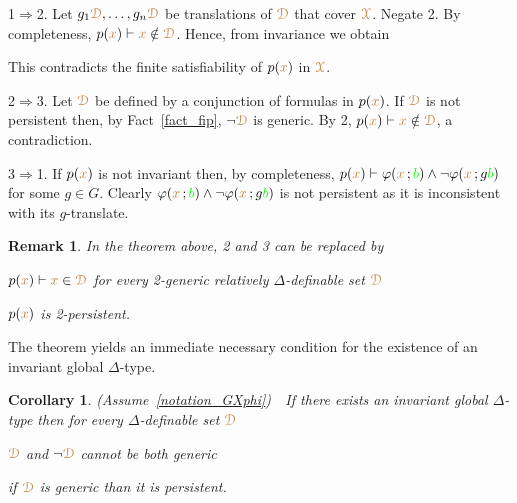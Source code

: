 \documentclass[10pt,openany]{amsproc}
\makeatletter
\newcommand{\mylabel}[1]{{\ssf{#1}}\hfill}
\renewenvironment{itemize}
  {\begin{list}{}{%
   \setlength{\parskip}{0mm}
   \setlength{\topsep}{.2\baselineskip}
   \setlength{\rightmargin}{0mm}
   \setlength{\listparindent}{0mm}
   \setlength{\itemindent}{0mm}
   \setlength{\labelwidth}{2ex}
   \setlength{\itemsep}{.1\baselineskip}
   \setlength{\parsep}{0mm}
   \setlength{\partopsep}{0mm}
   \setlength{\labelsep}{1ex}
   \setlength{\leftmargin}{\labelwidth+\labelsep}
   \let\makelabel\mylabel
   }}
   {\vspace*{-.3\baselineskip}\end{list}}
\def\proves{\vdash}
\def\IMP{\Rightarrow}
\def\D{\EuScript D}
\def\X{\EuScript X}
\def\theta{\vartheta}
\def\phi{\varphi}
\def\ssf#1{\textsf{\small #1}}
\newcounter{thm}
\theoremstyle{mio}
\newtheorem{corollary}[thm]{Corollary}\tcolorboxenvironment{corollary}{mythm}
\newtheorem{remark}[thm]{Remark}\tcolorboxenvironment{remark}{mythm}
\providecommand{\proofNameStyle}{\bfseries}
\renewenvironment{proof}[1][\proofname]{\par
  \pushQED{\qed}%
  \normalfont%
  \trivlist
  \item[\hskip\labelsep
        \proofNameStyle
    #1\@addpunct{.}]\ignorespaces
}{%
  \popQED\endtrivlist\@endpefalse
}
\def\mr{\color{brown}}
\def\gr{\color{green}}
\def\mrD{{\mr\D}}
\def\mrX{{\mr\X}}
\makeatother
\begin{document}
\begin{proof}
  \ssf1$\IMP$\ssf2.
  Let $g_1{\mr\D},\dots,g_n{\mr\D}$ be translations of $\mrD$ that cover $\mrX$.
  Negate \ssf2.
  By completeness, $p({\mr x})\proves {\mr x}\notin\mrD$.
  Hence, from invariance we obtain

  \ceq{\hfill p({\mr x})}{\proves}{{\mr x}\ \notin\ \bigcup_{i=1}^ng_i\mrD.}

  This contradicts the finite satisfiability of $p({\mr x})$ in $\mrX$.
  
  \ssf2$\IMP$\ssf3.
  Let $\mrD$ be defined by a conjunction of formulas in $p({\mr x})$.
  If $\mrD$ is not persistent then, by Fact~\ref{fact_fip}, $\neg\mrD$ is generic. 
  By \ssf2, $p({\mr x})\proves{\mr x}\notin\mrD$, a contradiction.

  \ssf3$\IMP$\ssf1.
  If $p({\mr x})$ is not invariant then, by completeness, $p({\mr x})\proves\phi({\mr x}\,;{\gr b})\wedge\neg\phi({\mr x}\,;g{\gr b})$ for some $g\in G$.
  Clearly $\phi({\mr x}\,;{\gr b})\wedge\neg\phi({\mr x}\,;g{\gr b})$ is not persistent as it is inconsistent with its $g$-translate.
\end{proof}

\begin{remark}
  In the theorem above, \ssf2 and \ssf3 can be replaced by
  \begin{itemize}
    \item[2$'$\!.] $p({\mr x})\proves{\mr x}\in\mrD$ for every 2-generic relatively $\Delta$-definable set $\mrD$
    \item[3$'$\!.] $p({\mr x})$ is 2-persistent.
  \end{itemize}
\end{remark}

The theorem yields an immediate necessary condition for the existence of an invariant global $\Delta$-type.

\begin{corollary}
  (Assume~\ref{notation_GXphi})\ \  
  If there exists an invariant global $\Delta$-type then for every $\Delta$-definable set $\mrD$
  \begin{itemize}
    \item[1.] $\mrD$ and $\neg\mrD$ cannot be both generic
    \item[2.] if $\mrD$ is generic than it is persistent.
  \end{itemize}
\end{corollary}
\end{document}
